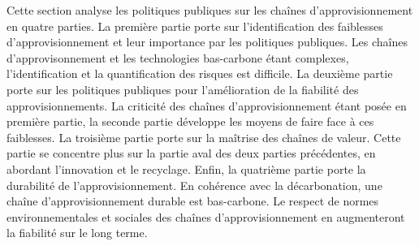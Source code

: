 Cette section analyse les politiques publiques sur les chaînes d'approvisionnement en quatre parties. La première partie porte sur l'identification des faiblesses d'approvisionnement et leur importance par les politiques publiques. Les chaînes d'approvisonnement et les technologies bas-carbone étant complexes, l'identification et la quantification des risques est difficile. La deuxième partie porte sur les politiques publiques pour l'amélioration de la fiabilité des approvisionnements. La criticité des chaînes d'approvisionnement étant posée en première partie, la seconde partie développe les moyens de faire face à ces faiblesses. La troisième partie porte sur la maîtrise des chaînes de valeur. Cette partie se concentre plus sur la partie aval des deux parties précédentes, en abordant l'innovation et le recyclage. Enfin, la quatrième partie porte la durabilité de l'approvisionnement. En cohérence avec la décarbonation, une chaîne d'approvisionnement durable est bas-carbone. Le respect de normes environnementales et sociales des chaînes d'approvisionnement en augmenteront la fiabilité sur le long terme. 

